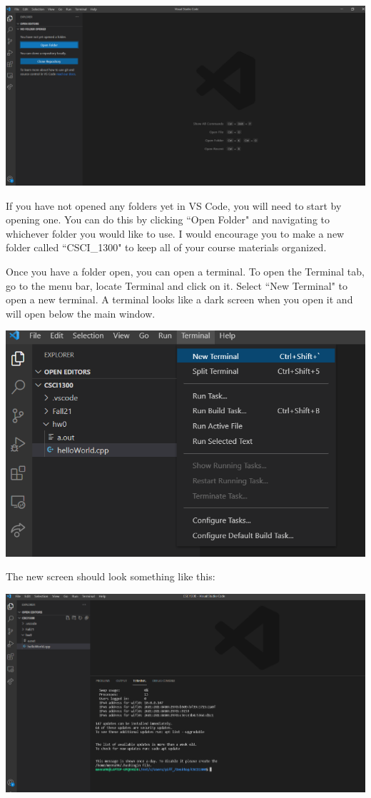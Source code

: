 \includegraphics[width=\textwidth]{images/learn_terminal_1.png}

If you have not opened any folders yet in VS Code, you will need to start by opening one. You can do this by clicking ``Open Folder" and navigating to whichever folder you would like to use. I would encourage you to make a new folder called ``CSCI\_1300" to keep all of your course materials organized. 

Once you have a folder open, you can open a terminal. To open the Terminal tab, go to the menu bar, locate Terminal and click on it. Select ``New Terminal" to open a new terminal. A terminal looks like a dark screen when you open it and will open below the main window.

\includegraphics[width=\textwidth]{images/learn_terminal_3.png}

The new screen should look something like this: 

\includegraphics[width=\textwidth]{images/learn_terminal_4.png}

